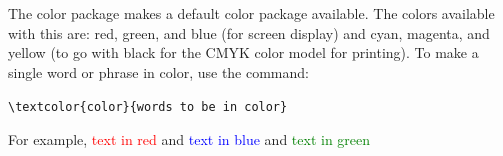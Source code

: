 ﻿\documentclass{article}
\begin{document}
The color package makes a default color package available. 
The colors available with this are: red, green, and blue (for screen display) 
and cyan, magenta, and yellow (to go with black for the CMYK color model for printing). 
To make a single word or phrase in color, use the command: 

\begin{center}
\verb#\textcolor{color}{words to be in color}#
\end{center}

For example, \textcolor{red}{text in red} and \textcolor{blue}{text in blue}
and \textcolor{green}{text in green}
\end{document}

